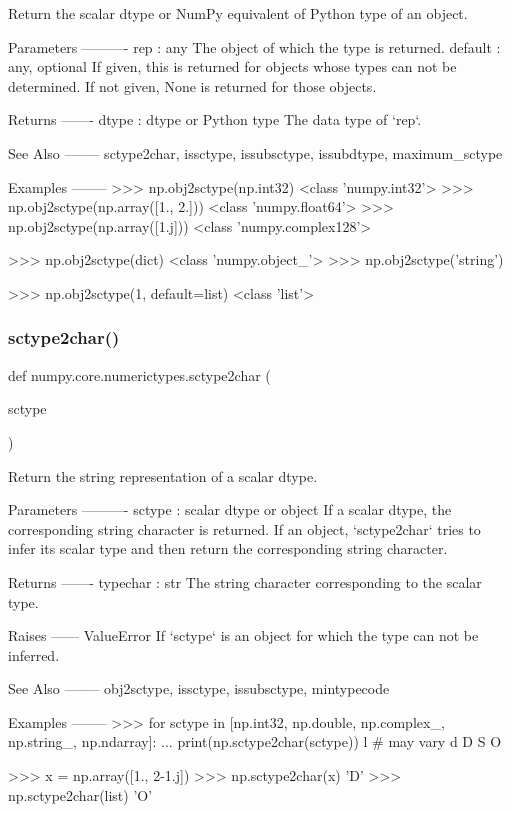 \begin{DoxyVerb}Return the scalar dtype or NumPy equivalent of Python type of an object.

Parameters
----------
rep : any
    The object of which the type is returned.
default : any, optional
    If given, this is returned for objects whose types can not be
    determined. If not given, None is returned for those objects.

Returns
-------
dtype : dtype or Python type
    The data type of `rep`.

See Also
--------
sctype2char, issctype, issubsctype, issubdtype, maximum_sctype

Examples
--------
>>> np.obj2sctype(np.int32)
<class 'numpy.int32'>
>>> np.obj2sctype(np.array([1., 2.]))
<class 'numpy.float64'>
>>> np.obj2sctype(np.array([1.j]))
<class 'numpy.complex128'>

>>> np.obj2sctype(dict)
<class 'numpy.object_'>
>>> np.obj2sctype('string')

>>> np.obj2sctype(1, default=list)
<class 'list'>\end{DoxyVerb}
 \mbox{\label{namespacenumpy_1_1core_1_1numerictypes_a0fc02b9c8ebbf34f43da02fd841e1e28}} 
\subsubsection{\texorpdfstring{sctype2char()}{sctype2char()}}
{\footnotesize\ttfamily def numpy.\+core.\+numerictypes.\+sctype2char (\begin{DoxyParamCaption}\item[{}]{sctype }\end{DoxyParamCaption})}

\begin{DoxyVerb}Return the string representation of a scalar dtype.

Parameters
----------
sctype : scalar dtype or object
    If a scalar dtype, the corresponding string character is
    returned. If an object, `sctype2char` tries to infer its scalar type
    and then return the corresponding string character.

Returns
-------
typechar : str
    The string character corresponding to the scalar type.

Raises
------
ValueError
    If `sctype` is an object for which the type can not be inferred.

See Also
--------
obj2sctype, issctype, issubsctype, mintypecode

Examples
--------
>>> for sctype in [np.int32, np.double, np.complex_, np.string_, np.ndarray]:
...     print(np.sctype2char(sctype))
l # may vary
d
D
S
O

>>> x = np.array([1., 2-1.j])
>>> np.sctype2char(x)
'D'
>>> np.sctype2char(list)
'O'\end{DoxyVerb}
 

